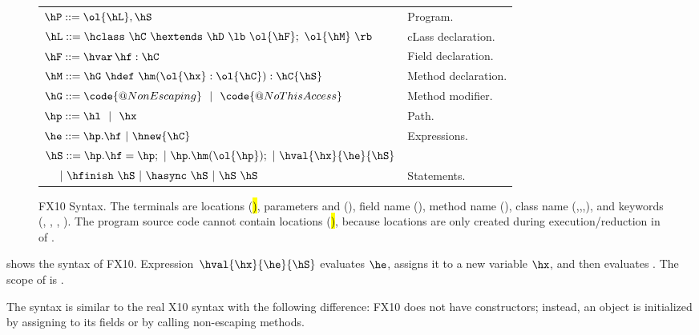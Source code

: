 \begin{figure}[htpb!]
\begin{center}
\begin{tabular}{|l|l|}
\hline

$\hP ::= \ol{\hL},\hS$ & Program. \\

$\hL ::= \hclass ~ \hC~\hextends~\hD~\lb~\ol{\hF};~\ol{\hM}~\rb$
& cLass declaration. \\

$\hF ::= \hvar\,\hf:\hC$
& Field declaration. \\

$\hM ::= \hG\ \hdef\ \hm(\ol{\hx}:\ol{\hC}):\hC\{\hS\}$
& Method declaration. \\

$\hG ::= \code{@NonEscaping} ~~|~~ \code{@NoThisAccess}$
& Method modifier. \\

$\hp ::= \hl ~~|~~ \hx$
& Path. \\ %

$\he ::=  \hp.\hf  ~|~ \hnew{\hC}$
& Expressions. \\ %

$\hS ::=  \hp.\hf = \hp; ~|~ \hp.\hm(\ol{\hp});  ~|~ \hval{\hx}{\he}{\hS}$ &\\
$~~~~|~ \hfinish~\hS~|~ \hasync~\hS ~|~ \hS\ \hS$
& Statements. \\ %

\hline
\end{tabular}
\end{center}
\caption{FX10 Syntax.
    The terminals are locations (\hl), parameters and \hthis (\hx), field name (\hf), method name (\hm), class name (\hB,\hC,\hD,\hObject),
        and keywords (\hhnew, \finish, \async, ).
    The program source code cannot contain locations (\hl), because locations are only created during execution/reduction in  of .
    }
\label{Figure:syntax}
\end{figure}

 shows the syntax of FX10.
Expression~$\hval{\hx}{\he}{\hS}$ evaluates $\he$, assigns it to a
new variable $\hx$, and then evaluates \hS. The scope of \hx{} is \hS.

The syntax is similar to the real X10 syntax with the following difference:
FX10 does not have constructors; instead, an object is initialized by assigning to its fields or
    by calling
    non-escaping methods.

